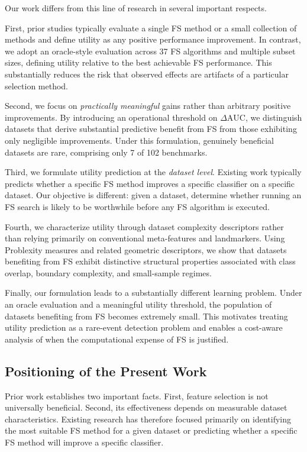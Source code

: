 \documentclass[preprint,12pt,authoryear]{elsarticle}
\begin{document}
Our work differs from this line of research in several important respects.

First, prior studies typically evaluate a single FS method or a small collection of methods and define utility as any positive performance improvement. In contrast, we adopt an oracle-style evaluation across 37 FS algorithms and multiple subset sizes, defining utility relative to the best achievable FS performance. This substantially reduces the risk that observed effects are artifacts of a particular selection method.

Second, we focus on \emph{practically meaningful} gains rather than arbitrary positive improvements. By introducing an operational threshold on $\Delta\mathrm{AUC}$, we distinguish datasets that derive substantial predictive benefit from FS from those exhibiting only negligible improvements. Under this formulation, genuinely beneficial datasets are rare, comprising only 7 of 102 benchmarks.

Third, we formulate utility prediction at the \emph{dataset level}. Existing work typically predicts whether a specific FS method improves a specific classifier on a specific dataset. Our objective is different: given a dataset, determine whether running an FS search is likely to be worthwhile before any FS algorithm is executed.

Fourth, we characterize utility through dataset complexity descriptors rather than relying primarily on conventional meta-features and landmarkers. Using Problexity measures and related geometric descriptors, we show that datasets benefiting from FS exhibit distinctive structural properties associated with class overlap, boundary complexity, and small-sample regimes.

Finally, our formulation leads to a substantially different learning problem. Under an oracle evaluation and a meaningful utility threshold, the population of datasets benefiting from FS becomes extremely small. This motivates treating utility prediction as a rare-event detection problem and enables a cost-aware analysis of when the computational expense of FS is justified.

\subsection{Positioning of the Present Work}

Prior work establishes two important facts. First, feature selection is not universally beneficial. Second, its effectiveness depends on measurable dataset characteristics. Existing research has therefore focused primarily on identifying the most suitable FS method for a given dataset or predicting whether a specific FS method will improve a specific classifier.
\end{document}
